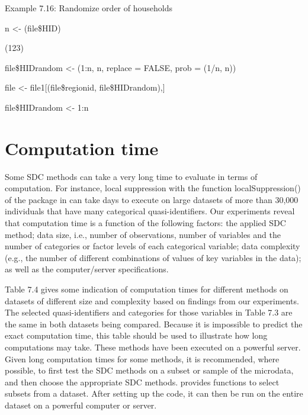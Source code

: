 \documentclass[letterpaper,10pt,english]{sphinxmanual}
\begin{document}
Example 7.16: Randomize order of households

n \textless{}- (file\$HID) 

\begin{DUlineblock}{0em}
\item[] (123) 
\item[] file\$HIDrandom \textless{}- (1:n, n, replace = FALSE, prob =
(1/n, n)) 
\end{DUlineblock}

file \textless{}- file1{[}(file\$regionid, file\$HIDrandom),{]} 

file\$HIDrandom \textless{}- 1:n 


\section{Computation time}
\label{\detokenize{sdcMicro:computation-time}}
Some SDC methods can take a very long time to evaluate in terms of
computation. For instance, local suppression with the function
localSuppression() of the  package in  can take days to
execute on large datasets of more than 30,000 individuals that have many
categorical quasi-identifiers. Our experiments reveal that computation
time is a function of the following factors: the applied SDC method;
data size, i.e., number of observations, number of variables and the
number of categories or factor levels of each categorical variable; data
complexity (e.g., the number of different combinations of values of key
variables in the data); as well as the computer/server specifications.

Table 7.4 gives some indication of computation times for different
methods on datasets of different size and complexity based on findings
from our experiments. The selected quasi-identifiers and categories for
those variables in Table 7.3 are the same in both datasets being
compared. Because it is impossible to predict the exact computation
time, this table should be used to illustrate how long computations may
take. These methods have been executed on a powerful server. Given long
computation times for some methods, it is recommended, where possible,
to first test the SDC methods on a subset or sample of the microdata,
and then choose the appropriate SDC methods.  provides functions to
select subsets from a dataset. After setting up the code, it can then be
run on the entire dataset on a powerful computer or server.
\end{document}
